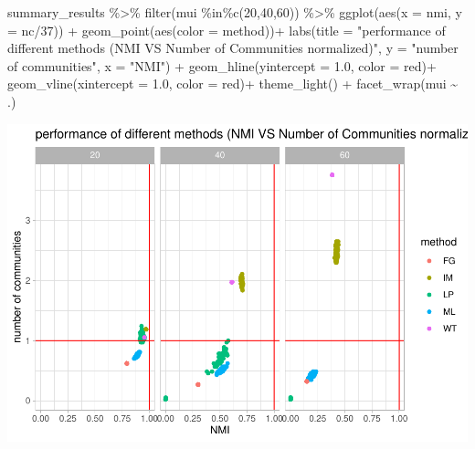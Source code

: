 \documentclass[
]{article}
\newenvironment{Shaded}{\begin{snugshade}}{\end{snugshade}}
\newcommand{\AttributeTok}[1]{\textcolor[rgb]{0.77,0.63,0.00}{#1}}
\newcommand{\DecValTok}[1]{\textcolor[rgb]{0.00,0.00,0.81}{#1}}
\newcommand{\FloatTok}[1]{\textcolor[rgb]{0.00,0.00,0.81}{#1}}
\newcommand{\FunctionTok}[1]{\textcolor[rgb]{0.00,0.00,0.00}{#1}}
\newcommand{\NormalTok}[1]{#1}
\newcommand{\SpecialCharTok}[1]{\textcolor[rgb]{0.00,0.00,0.00}{#1}}
\newcommand{\StringTok}[1]{\textcolor[rgb]{0.31,0.60,0.02}{#1}}
\begin{document}
\begin{Shaded}
\begin{Highlighting}[]
\NormalTok{summary\_results }\SpecialCharTok{\%\textgreater{}\%} \FunctionTok{filter}\NormalTok{(mui }\SpecialCharTok{\%in\%}\FunctionTok{c}\NormalTok{(}\DecValTok{20}\NormalTok{,}\DecValTok{40}\NormalTok{,}\DecValTok{60}\NormalTok{)) }\SpecialCharTok{\%\textgreater{}\%}
    \FunctionTok{ggplot}\NormalTok{(}\FunctionTok{aes}\NormalTok{(}\AttributeTok{x =}\NormalTok{ nmi, }\AttributeTok{y =}\NormalTok{ nc}\SpecialCharTok{/}\DecValTok{37}\NormalTok{)) }\SpecialCharTok{+}
    \FunctionTok{geom\_point}\NormalTok{(}\FunctionTok{aes}\NormalTok{(}\AttributeTok{color =}\NormalTok{ method))}\SpecialCharTok{+}
    \FunctionTok{labs}\NormalTok{(}\AttributeTok{title =} \StringTok{"performance of different methods (NMI VS Number of Communities normalized)"}\NormalTok{, }
         \AttributeTok{y =} \StringTok{"number of communities"}\NormalTok{, }\AttributeTok{x =} \StringTok{"NMI"}\NormalTok{) }\SpecialCharTok{+}
    \FunctionTok{geom\_hline}\NormalTok{(}\AttributeTok{yintercept =} \FloatTok{1.0}\NormalTok{, }\AttributeTok{color =} \StringTok{\textquotesingle{}red\textquotesingle{}}\NormalTok{)}\SpecialCharTok{+}
    \FunctionTok{geom\_vline}\NormalTok{(}\AttributeTok{xintercept =} \FloatTok{1.0}\NormalTok{, }\AttributeTok{color =} \StringTok{\textquotesingle{}red\textquotesingle{}}\NormalTok{)}\SpecialCharTok{+}
    \FunctionTok{theme\_light}\NormalTok{()  }\SpecialCharTok{+} \FunctionTok{facet\_wrap}\NormalTok{(mui }\SpecialCharTok{\textasciitilde{}}\NormalTok{ .)}
\end{Highlighting}
\end{Shaded}

\includegraphics{com_det_algorithms_files/figure-latex/unnamed-chunk-25-1.pdf}
\end{document}
